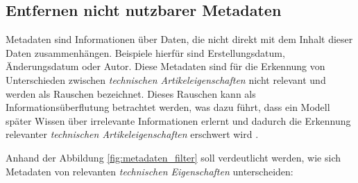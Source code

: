 \subsection{Entfernen nicht nutzbarer Metadaten}
\label{sec:entfernen_nicht_nutzbarer_metadaten}

Metadaten sind Informationen über Daten, die nicht direkt mit dem Inhalt dieser Daten zusammenhängen. Beispiele hierfür sind Erstellungsdatum, Änderungsdatum oder Autor. 
Diese Metadaten sind für die Erkennung von Unterschieden zwischen \textit{technischen Artikeleigenschaften} nicht relevant und werden als Rauschen bezeichnet.
Dieses Rauschen kann als Informationsüberflutung betrachtet werden, was dazu führt, dass ein Modell später Wissen über irrelevante Informationen erlernt und dadurch die Erkennung relevanter \textit{technischen Artikeleigenschaften} erschwert wird \cite{sabzekar2021noiseaware}.

Anhand der Abbildung \ref{fig:metadaten_filter} soll verdeutlicht werden, wie sich Metadaten von relevanten \textit{technischen Eigenschaften} unterscheiden:

